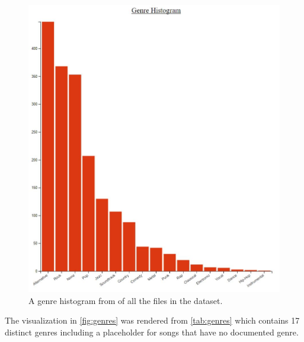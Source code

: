 \documentclass[journal]{vgtc}                %
\begin{document}
\begin{figure}[h]
 \centering %
 \includegraphics[width=\columnwidth]{genre-histogram}
 \caption{A genre histogram from \cite{Grifski:2019} of all the files in the dataset.}
 \label{fig:genres}
\end{figure}

The visualization in \autoref{fig:genres} was rendered from \autoref{tab:genres}
which contains 17 distinct genres including a placeholder for songs that have
no documented genre.
\end{document}
